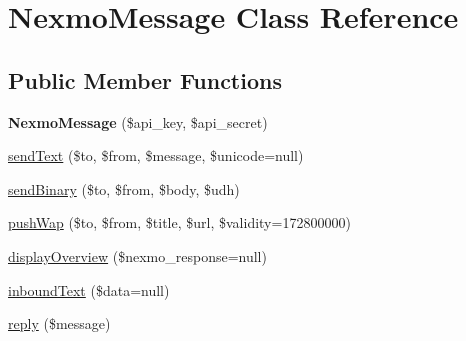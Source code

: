 \hypertarget{class_nexmo_message}{\section{Nexmo\-Message Class Reference}
\label{class_nexmo_message}
}
\subsection*{Public Member Functions}
\begin{DoxyCompactItemize}
\item 
\hypertarget{class_nexmo_message_a3a3e2d918e19107bb3039d9b76e767f3}{{\bfseries Nexmo\-Message} (\$api\-\_\-key, \$api\-\_\-secret)}\label{class_nexmo_message_a3a3e2d918e19107bb3039d9b76e767f3}

\item 
\hyperlink{class_nexmo_message_a695b9593c4f45a97f220815ccaadc86f}{send\-Text} (\$to, \$from, \$message, \$unicode=null)
\item 
\hyperlink{class_nexmo_message_abe32265395a044dc6c4d282b2fb37602}{send\-Binary} (\$to, \$from, \$body, \$udh)
\item 
\hyperlink{class_nexmo_message_a305b569184e17ace603f698da0bd7e56}{push\-Wap} (\$to, \$from, \$title, \$url, \$validity=172800000)
\item 
\hyperlink{class_nexmo_message_a7285f781df3fe85d8f40d9d76860a7eb}{display\-Overview} (\$nexmo\-\_\-response=null)
\item 
\hyperlink{class_nexmo_message_abf6a501d78da977b11ec78aa91b98edb}{inbound\-Text} (\$data=null)
\item 
\hyperlink{class_nexmo_message_adadbb1f0b565148fb0c6f400a7e99ad6}{reply} (\$message)
\end{DoxyCompactItemize}

